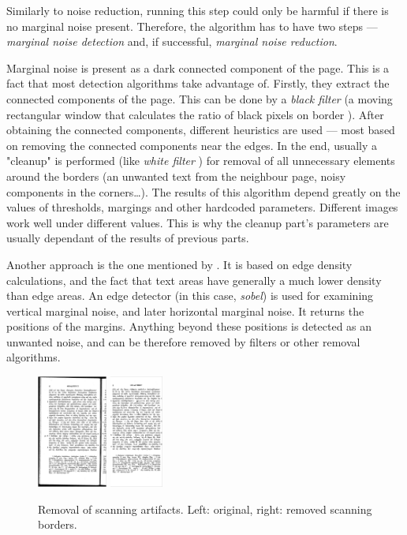 Similarly to noise reduction, running this step could only be harmful if there is no marginal noise present. Therefore, the algorithm has to have two steps --- \emph{marginal noise detection} and, if successful, \emph{marginal noise reduction}.

Marginal noise is present as a dark connected component of the page. This is a fact that most detection algorithms take advantage of. Firstly, they extract the connected components of the page. This can be done by a \emph{black filter} (a moving rectangular window that calculates the ratio of black pixels on border \citep{marginalNoiseWindow}). After obtaining the connected components, different heuristics are used --- most based on removing the connected components near the edges. In the end, usually a "cleanup" is performed (like \emph{white filter} \citep{marginalNoiseWindow}) for removal of all unnecessary elements around the borders (an unwanted text from the neighbour page, noisy components in the corners\ldots).
The results of this algorithm depend greatly on the values of thresholds, margings and other hardcoded parameters. Different images work well under different values. This is why the cleanup part's parameters are usually dependant of the results of previous parts.

Another approach is the one mentioned by \citet{marginalNoiseEdge}. It is based on edge density calculations, and the fact that text areas have generally a much lower density than edge areas. An edge detector (in this case, \emph{sobel}) is used for examining vertical marginal noise, and later horizontal marginal noise. It returns the positions of the margins. Anything beyond these positions is detected as an unwanted noise, and can be therefore removed by filters or other removal algorithms.

\begin{figure}
\centering

\includegraphics[height=10em]{img/preprocessing/scan_borders_orig.png}
\qquad
\includegraphics[height=10em]{img/preprocessing/scan_borders_result.png}

\caption{Removal of scanning artifacts. Left: original, right: removed scanning borders.}
\label{fig:scanning}
\end{figure}

